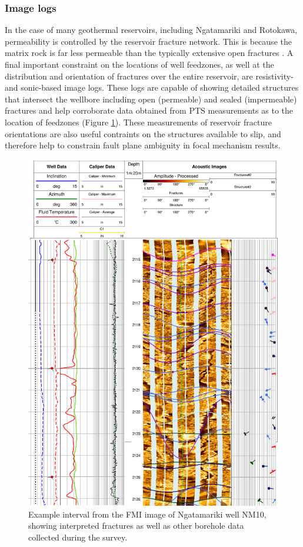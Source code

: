 \subsubsection{Image logs}
In the case of many geothermal reservoirs, including Ngatamariki and Rotokawa, \gls{permeability} is controlled by the reservoir fracture network. This is because the matrix rock is far less permeable than the typically extensive open fractures \citep{Grant_2011,Cant_2018}. A final important constraint on the locations of well \glspl{feedzone}, as well at the distribution and orientation of fractures over the entire reservoir, are resistivity- and sonic-based image logs. These logs are capable of showing detailed structures that intersect the wellbore including open (permeable) and sealed (impermeable) fractures and help corroborate data obtained from PTS measurements as to the location of \glspl{feedzone} (Figure \ref{746257}). These measurements of reservoir fracture orientations are also useful contraints on the structures available to slip, and therefore help to constrain fault plane ambiguity in focal mechanism results.

\begin{figure}[h!]
\begin{center}
\includegraphics[width=0.70\columnwidth]{Chapter_2_Data/figures/FMI_example_mod/FMI_example_mod}
\caption[Example wellbore image data]{{
Example interval from the FMI image of Ngatamariki well NM10, showing
interpreted fractures as well as other borehole data collected during
the survey.
{\label{746257}}%
}}
\end{center}
\end{figure}

